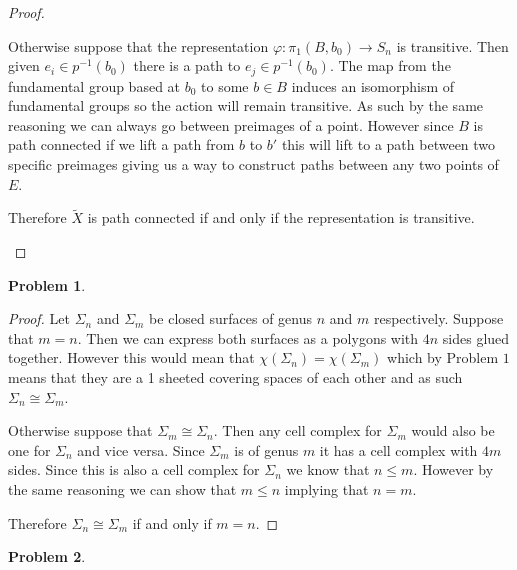 \documentclass[10pt]{article}
\newcommand{\sk}{\vskip 10mm}
\newcommand{\wt}[1]{\widetilde{#1}}
\theoremstyle{plain}
\newtheorem{problem}{Problem}
\theoremstyle{remark}
\begin{document}
\begin{proof}
\begin{itemize}
    Otherwise suppose that the representation
    $\varphi:\pi_1(B,b_0)\rightarrow S_n$ is transitive. Then given
    $e_i\in p^{-1}(b_0)$ there is a path to $e_j\in p^{-1}(b_0)$.
    The map from the fundamental group based at $b_0$ to
    some $b\in B$ induces an isomorphism of fundamental groups
    so the action will remain transitive. As such by the
    same reasoning we can always go between preimages of
    a point. However since $B$ is path connected if
    we lift a path from $b$ to $b'$ this will lift
    to a path between two specific preimages giving us
    a way to construct paths between any two points of $E$.

    Therefore $\wt{X}$ is path connected if and only if
    the representation is transitive.
  \end{itemize}
\end{proof}

\sk

\begin{problem} %
  
\end{problem}

\begin{proof}
  Let $\Sigma_n$ and $\Sigma_m$ be closed surfaces of genus $n$ and $m$
  respectively. Suppose that $m=n$. Then we can express
  both surfaces as a polygons with $4n$ sides glued together.
  However this would mean that $\chi(\Sigma_n)=\chi(\Sigma_m)$ which by
  Problem $1$ means that they are a 1 sheeted covering
  spaces of each other and as such $\Sigma_n\cong \Sigma_m$.

  Otherwise suppose that $\Sigma_m\cong\Sigma_n$. Then any cell complex
  for $\Sigma_m$ would also be one for $\Sigma_n$ and vice versa.
  Since $\Sigma_m$ is of genus $m$ it has a cell complex
  with $4m$ sides. Since this is also a cell complex
  for $\Sigma_n$ we know that $n\leq m$. However by the same
  reasoning we can show that $m\leq n$ implying that
  $n=m$.

  Therefore $\Sigma_n\cong\Sigma_m$ if and only if $m=n$.
\end{proof}

\sk

\begin{problem} %
  
\end{problem}
\end{document}
